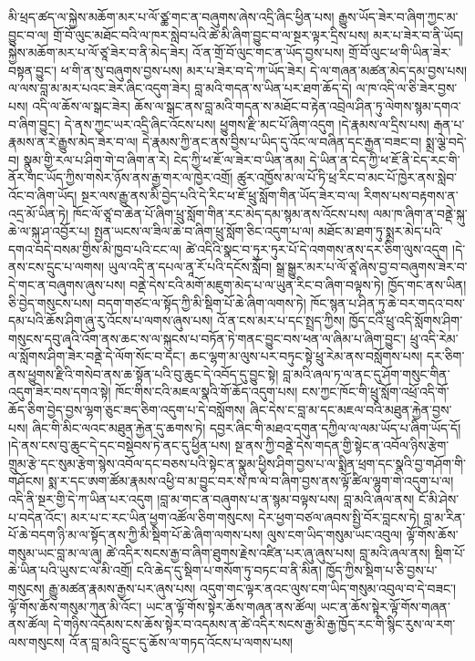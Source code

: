 \documentclass{article}
\begin{document}
མི་ཕྲད་ཚད་ལ་སྐྱེས་མཆོག་མར་པ་ལོ་ཙྪ་གང་ན་བཞུགས་ཞེས་འདྲི་ཞིང་ཕྱིན་པས། རྒྱུས་ཡོད་ཟེར་བ་ཞིག་ཀྱང་མ་བྱུང་བ་ལ། གྲོ་བོ་ལུང་མཐོང་བའི་ལ་ཁར་སླེབ་པའི་ཚེ་མི་ཞིག་བྱུང་བ་ལ་སྔར་ལྟར་དྲིས་པས། མར་པ་ཟེར་བ་ནི་ཡོད། སྐྱེས་མཆོག་མར་པ་ལོ་ཙཱ་ཟེར་བ་ནི་མེད་ཟེར། འོ་ན་གྲོ་བོ་ལུང་གང་ན་ཡོད་བྱས་པས། གྲོ་བོ་ལུང་ཕ་གི་ཡིན་ཟེར་བསྟན་བྱུང་། ཕ་གི་ན་སུ་བཞུགས་བྱས་པས། མར་པ་ཟེར་བ་དེ་ཀ་ཡོད་ཟེར། དེ་ལ་གཞན་མཚན་མེད་དམ་བྱས་པས། ལ་ལས་བླ་མ་མར་པའང་ཟེར་ཞིང་འདུག་ཟེར། བླ་མའི་གདན་ས་ཡིན་པར་ཐག་ཆོད་དེ། ལ་ཁ་འདི་ལ་ཅི་ཟེར་བྱས་པས། འདི་ལ་ཆོས་ལ་སྒང་ཟེར། ཆོས་ལ་སྒང་ནས་བླ་མའི་གདན་ས་མཐོང་བ་རྟེན་འབྲེལ་ཤིན་ཏུ་ལེགས་སྙམ་དགའ་བ་ཞིག་བྱུང་། དེ་ནས་ཀྱང་ཡར་འདྲི་ཞིང་འོངས་པས། ཕྱུགས་རྫི་མང་པོ་ཞིག་འདུག །དེ་རྣམས་ལ་དྲིས་པས། རྒན་པ་རྣམས་ན་རེ་རྒྱུས་མེད་ཟེར་བ་ལ། དེ་རྣམས་ཀྱི་ནང་ནས་བྱིས་པ་ཡིད་དུ་འོང་ལ་བཞིན་དང་རྒྱན་བཟང་བ། སྨྲ་ལྕེ་བདེ་བ། སྣུམ་གྱི་རལ་པ་ཤིག་གེ་བ་ཞིག་ན་རེ། ངེད་ཀྱི་ཕ་ཇོ་ལ་ཟེར་བ་ཡིན་ནམ། དེ་ཡིན་ན་ངེད་ཀྱི་ཕ་ཇོ་ནི་ངེད་རང་གི་ནོར་གང་ཡོད་ཀྱིས་གསེར་ཉོས་ནས་རྒྱ་གར་ལ་ཁྱེར་འགྲོ། ཚུར་འཁྱོས་མ་ལ་པོ་ཏི་ཕྲ་རིང་བ་མང་པོ་ཁྱེར་ནས་སླེབ་འོང་བ་ཞིག་ཡོད། སྔར་ལས་རྒྱུ་ནས་མི་བྱེད་པའི་དེ་རིང་ཕ་ཇོ་ཕྲུ་སློག་གིན་ཡོད་ཟེར་བ་ལ། རིགས་པས་བརྟགས་ན་འདྲ་མོ་ཡིན་ཏེ། ཁོང་ལོ་ཙཱ་བ་ཆེན་པོ་ཞིག་ཕྲུ་སློག་གིན་རང་མེད་དམ་སྙམ་ནས་འོངས་པས། ལམ་ཁ་ཞིག་ན་བནྡེ་སྐུ་ཆེ་ལ་སྐུ་ཤ་འབྱོར་པ། སྤྱན་ཡངས་ལ་ཟིལ་ཆེ་བ་ཞིག་ཕྲུ་སློག་ཅིང་འདུག་པ་ལ། མཐོང་མ་ཐག་ཏུ་སྨྲར་མེད་པའི་དགའ་བདེ་བསམ་གྱིས་མི་ཁྱབ་པའི་ངང་ལ། ཚེ་འདིའི་སྣང་བ་ཏུར་ཏུར་པོ་དེ་འགགས་ནས་དར་ཅིག་ལུས་འདུག །དེ་ནས་ངས་དྲུང་པ་ལགས། ཡུལ་འདི་ན་དཔལ་ནཱ་རོ་པའི་དངོས་སློབ། སྒྲ་སྒྱུར་མར་པ་ལོ་ཙཱ་ཞེས་བྱ་བ་བཞུགས་ཟེར་བ་དེ་གང་ན་བཞུགས་ཞུས་པས། བནྡེ་དེས་ངའི་མགོ་མཇུག་མེད་པ་ལ་ཡུན་རིང་བ་ཞིག་བལྟས་ཏེ། ཁྱོད་གང་ནས་ཡིན། ཅི་བྱེད་གསུངས་པས། བདག་གཙང་ལ་སྟོད་ཀྱི་མི་སྡིག་པོ་ཆེ་ཞིག་ལགས་ཏེ། ཁོང་སྙན་པ་ཤིན་ཏུ་ཆེ་བར་གདའ་བས་དམ་པའི་ཆོས་ཤིག་ཞུ་རུ་འོངས་པ་ལགས་ཞུས་པས། འོ་ན་ངས་མར་པ་དང་སྤྲད་ཀྱིས། ཁྱོད་ངའི་ཕྲུ་འདི་སློགས་ཤིག་གསུངས་དབུ་ཞྭའི་འོག་ནས་ཆང་ས་ལ་སྐུངས་པ་བཏོན་ཏེ་གནང་བྱུང་བས་ཕན་ལ་ཞིམ་པ་ཞིག་བྱུང་། ཕྲུ་འདི་རེམ་ལ་སློགས་ཤིག་ཟེར་བནྡེ་དེ་ལོག་སོང་བ་དང་། ཆང་ལྷག་མ་ལུས་པར་བཏུང་སྟེ་ཕྲུ་རེམ་ནས་བསློགས་པས། དར་ཅིག་ནས་ཕྱུགས་རྫིའི་གསེབ་ནས་ཆ་སྟོན་པའི་བུ་ཆུང་དེ་འབོད་དུ་བྱུང་སྟེ། བླ་མའི་ཞལ་ཏ་ལ་ནང་དུ་ཤོག་གསུང་གིན་འདུག་ཟེར་བས་དགའ་སྟེ། ཁོང་གིས་ངའི་མཇལ་སྣའི་གོ་ཆོད་འདུག་པས། ངས་ཀྱང་ཁོང་གི་ཕྲུ་སློག་འཕྲོ་འདི་གོ་ཆོད་ཅིག་བྱེད་བྱས་ལྷག་ཅུང་ཟད་ཅིག་འདུག་པ་དེ་བསློགས། ཞིང་དེས་ང་བླ་མ་དང་མཇལ་བའི་མཐུན་རྐྱེན་བྱས་པས། ཞིང་གི་མིང་ལའང་མཐུན་རྐྱེན་དུ་ཆགས་ཏེ། དབྱར་ཞིང་གི་མཐའ་དགུན་དཀྱིལ་ལ་ལམ་ཡོད་པ་ཞིག་ཡོད་དོ། །དེ་ནས་ངས་བུ་ཆུང་དེ་དང་བསྡེབས་ཏེ་ནང་དུ་ཕྱིན་པས། སྔ་ནས་ཀྱི་བནྡེ་དེས་གདན་གྱི་སྟེང་ན་འབོལ་ཉིས་རྩེག་གྲུམ་རྩེ་དང་སུམ་རྩེག་སྙེས་འབོལ་དང་བཅས་པའི་སྟེང་ན་སྣུམ་ཕྱིས་ཤིག་བྱས་པ་ལ་སྨིན་ཕྲག་དང་སྣའི་བྱ་གཤོག་གི་གཤོངས། སྨ་ར་དང་ཨག་ཚོམ་རྣམས་འཕྱི་བ་མ་བྱུང་བར་ས་ཁ་ལེ་བ་ཞིག་བྱས་ནས་ལྟོ་ཚིལ་ལྷུག་གེ་འདུག་པ་ལ། འདི་ནི་སྔར་གྱི་དེ་ཀ་ཡིན་པར་འདུག །བླ་མ་གང་ན་བཞུགས་པ་ན་སྙམ་བལྟས་པས། བླ་མའི་ཞལ་ནས། ངོ་མི་ཤེས་པ་བདེན་འོང་། མར་པ་ང་རང་ཡིན་ཕྱག་འཚོལ་ཅིག་གསུངས། དེར་ཕྱག་བཙལ་ཞབས་སྤྱི་བོར་བླངས་ཏེ། བླ་མ་རིན་པོ་ཆེ་བདག་ཉི་མ་ལ་སྟོད་ནས་ཀྱི་མི་སྡིག་པོ་ཆེ་ཞིག་ལགས་པས། ལུས་ངག་ཡིད་གསུམ་ཡང་འབུལ། ལྟོ་གོས་ཆོས་གསུམ་ཡང་བླ་མ་ལ་ཞུ། ཚེ་འདིར་སངས་རྒྱ་བ་ཞིག་ཐུགས་རྗེས་འཛིན་པར་ཞུ་ཞུས་པས། བླ་མའི་ཞལ་ནས། སྡིག་པོ་ཆེ་ཡིན་པའི་ཡུས་ང་ལ་མི་འགྲོ། ངའི་ཆེད་དུ་སྡིག་པ་གསོག་ཏུ་བཏང་བ་ནི་མིན། ཁྱོད་ཀྱིས་སྡིག་པ་ཅི་བྱས་པ་གསུངས། རྒྱུ་མཚན་རྣམས་རྒྱས་པར་ཞུས་པས། འདུག་གང་ལྟར་ནའང་ལུས་ངག་ཡིད་གསུམ་འབུལ་བ་དེ་བཟང་། ལྟོ་གོས་ཆོས་གསུམ་ཀུན་མི་འོང་། ཡང་ན་ལྟོ་གོས་སྟེར་ཆོས་གཞན་ནས་ཚོལ། ཡང་ན་ཆོས་སྟེར་ལྟོ་གོས་གཞན་ནས་ཚོལ། དེ་གཉིས་འདོམས་ངས་ཆོས་སྟེར་བ་འདམས་ན་ཚེ་འདིར་སངས་རྒྱ་མི་རྒྱ་ཁྱོད་རང་གི་སྙིང་རུས་ལ་རག་ལས་གསུངས། འོ་ན་བླ་མའི་དྲུང་དུ་ཆོས་ལ་གཏད་འོངས་པ་ལགས་པས། 
\end{document}
